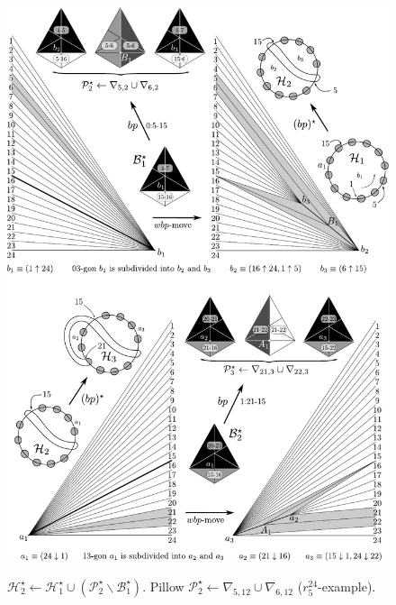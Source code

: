

\begin{figure}[!htb]
\begin{center}
\includegraphics[width=15cm]{A.figs/bpandwinglist123.pdf} \\
\caption{\sf 
$\mathcal{H}^\star_{2} \leftarrow \mathcal{H}^\star_1 
\cup (\mathcal{P}_{2}^\star \backslash \mathcal{B}_1^\star)$. 
Pillow $\mathcal{P}_{2}^\star \leftarrow 
\nabla_{5,12}\cup \nabla_{6,12}$
($r^{24}_5$-example).}
\label{fig:winglist01}
\end{center}
\end{figure}

